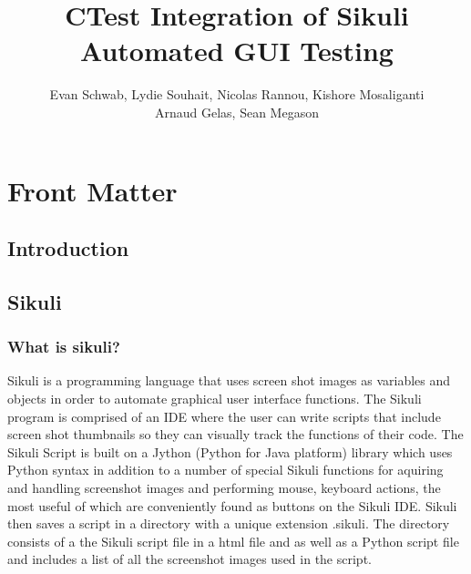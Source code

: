 \documentclass{InsightArticle}
\title{CTest Integration of Sikuli Automated GUI Testing}
\author{Evan Schwab, Lydie Souhait, Nicolas Rannou, Kishore Mosaliganti\\
Arnaud Gelas, Sean Megason}
\newcommand{\IJhandlerIDnumber}{3196}
\begin{document}
\IJhandlefooter{\IJhandlerIDnumber}


\ifpdf
\else
\fi

\maketitle

\ifhtml
\chapter*{Front Matter\label{front}}
\fi

\begin{abstract}
\noindent
\end{abstract}

\IJhandlenote{\IJhandlerIDnumber}

\tableofcontents
\section{Introduction}

\section{Sikuli}

\subsection{What is sikuli?}
Sikuli is a programming language that uses screen shot images as variables
and objects in order to automate graphical user interface functions. The
Sikuli program is comprised of an IDE where the user can write scripts that 
include screen shot thumbnails so they can visually track the functions of
their code. The Sikuli Script is built on a Jython (Python for Java platform)
library which uses Python syntax in addition to a number of special Sikuli
functions for aquiring and handling screenshot images and performing mouse,
keyboard actions, the most useful of which are conveniently found as buttons
on the Sikuli IDE.  Sikuli then saves a script in a directory with a unique
extension .sikuli.  The directory consists of a the Sikuli script file in a 
html file and as well as a Python script file and includes a list of all the 
screenshot images used in the script. 
\end{document}
